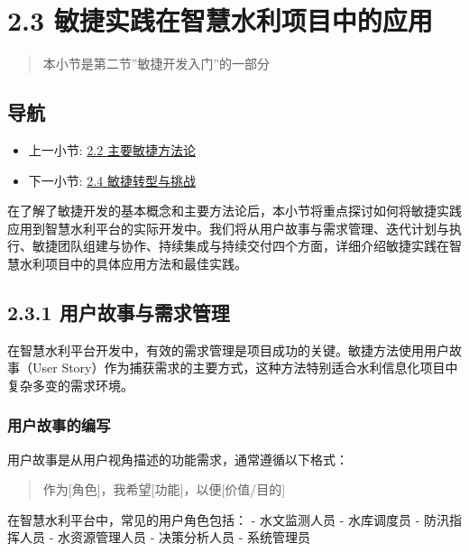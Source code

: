 \section{2.3
敏捷实践在智慧水利项目中的应用}\label{ux654fux6377ux5b9eux8df5ux5728ux667aux6167ux6c34ux5229ux9879ux76eeux4e2dux7684ux5e94ux7528}

\begin{quote}
本小节是第二节''敏捷开发入门''的一部分
\end{quote}

\subsection{导航}\label{ux5bfcux822a}

\begin{itemize}
\tightlist
\item
  上一小节: \href{section03-02-02.md}{2.2 主要敏捷方法论}
\item
  下一小节: \href{section03-02-04.md}{2.4 敏捷转型与挑战}
\end{itemize}

在了解了敏捷开发的基本概念和主要方法论后，本小节将重点探讨如何将敏捷实践应用到智慧水利平台的实际开发中。我们将从用户故事与需求管理、迭代计划与执行、敏捷团队组建与协作、持续集成与持续交付四个方面，详细介绍敏捷实践在智慧水利项目中的具体应用方法和最佳实践。

\subsection{2.3.1
用户故事与需求管理}\label{ux7528ux6237ux6545ux4e8bux4e0eux9700ux6c42ux7ba1ux7406}

在智慧水利平台开发中，有效的需求管理是项目成功的关键。敏捷方法使用用户故事（User
Story）作为捕获需求的主要方式，这种方法特别适合水利信息化项目中复杂多变的需求环境。

\subsubsection{用户故事的编写}\label{ux7528ux6237ux6545ux4e8bux7684ux7f16ux5199}

用户故事是从用户视角描述的功能需求，通常遵循以下格式：

\begin{quote}
作为{[}角色{]}，我希望{[}功能{]}，以便{[}价值/目的{]}
\end{quote}

在智慧水利平台中，常见的用户角色包括： - 水文监测人员 - 水库调度员 -
防汛指挥人员 - 水资源管理人员 - 决策分析人员 - 系统管理员


